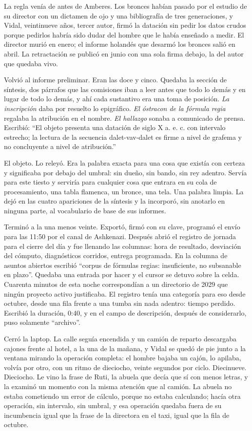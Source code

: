 La regla venía de antes de Amberes. Los bronces habían pasado por el estudio de su director con un dictamen de ojo y una bibliografía de tres generaciones, y Vidal, veintinueve años, tercer autor, firmó la datación sin pedir los datos crudos porque pedirlos habría sido dudar del hombre que le había enseñado a medir. El director murió en enero; el informe holandés que desarmó los bronces salió en abril. La retractación se publicó en junio con una sola firma debajo, la del autor que quedaba vivo.

Volvió al informe preliminar. Eran las doce y cinco. Quedaba la sección de síntesis, dos párrafos que las comisiones iban a leer antes que todo lo demás y en lugar de todo lo demás, y ahí cada sustantivo era una toma de posición. \textit{La inscripción} daba por resuelto lo epigráfico. \textit{El óstracon de la fórmula regia} regalaba la atribución en el nombre. \textit{El hallazgo} sonaba a comunicado de prensa. Escribió: ``El objeto presenta una datación de siglo X a. e. c. con intervalo estrecho; la lectura de la secuencia dalet-vav-dalet es firme a nivel de grafema y no concluyente a nivel de atribución.''

El objeto. Lo releyó. Era la palabra exacta para una cosa que existía con certeza y significaba por debajo del umbral: sin dueño, sin bando, sin rey adentro. Servía para este tiesto y serviría para cualquier cosa que entrara en su cola de procesamiento, una tabla flamenca, un bronce, una tela. Una palabra limpia. La dejó en las cuatro apariciones de la síntesis y la incorporó, sin anotarlo en ninguna parte, al vocabulario de base de sus informes.

Terminó a la una menos veinte. Exportó, firmó con su clave, programó el envío para las 11:50 por el canal de Ashkenazi. Después abrió el registro de jornada para el cierre del día y fue llenando las columnas: hora de resultado, desviación del cómputo, diagnósticos corridos, entrega programada. En la columna de asuntos abiertos escribió ``corpus de fórmulas regias: insuficiente, no subsanable en plazo''. Quedaba una entrada por hacer y el cursor se detuvo sobre la celda. Cuarenta minutos de esta noche correspondían a un directorio de 2029 que ningún proyecto activo justificaba. El registro tenía una categoría para eso desde octubre, desde una fila frente a una tumba sin nada adentro: tiempo perdido. Escribió la duración, 0:40, y en el campo de descripción, después de considerarlo, puso solamente ``archivo''.

Cerró la laptop. La calle seguía encendida y un camión de reparto descargaba cajones frente al hotel, a la una de la mañana, y Vidal se quedó de pie junto a la ventana mirando la operación completa: el hombre bajaba un cajón, lo apilaba, volvía por otro, con un ritmo de dieciocho, veinte segundos por ciclo. Diecinueve. Dieciocho. Le vino la frase de Ruti, la abuela que decía que sí con menos letras, y la examinó un momento con la misma atención que al camión. La abuela no estaba cometiendo un error de cálculo, porque no estaba calculando; hacía otra operación, sin intervalo, sin umbral, y esa operación quedaba fuera de su incumbencia igual que la frase de la directora en el taxi, igual que la fila de octubre.

